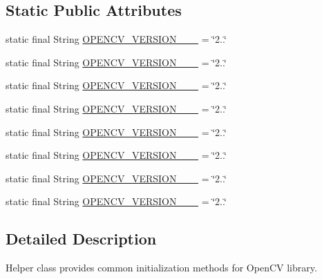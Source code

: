 \subsection*{Static Public Attributes}
\begin{DoxyCompactItemize}
\item 
static final String \mbox{\hyperlink{classorg_1_1opencv_1_1android_1_1_open_c_v_loader_a8318aebf0d76ee4686fc6ce690de74ac}{O\+P\+E\+N\+C\+V\+\_\+\+V\+E\+R\+S\+I\+O\+N\+\_\+\_\+\_}} = \char`\"{}2..\char`\"{}
\item 
static final String \mbox{\hyperlink{classorg_1_1opencv_1_1android_1_1_open_c_v_loader_af78d4d269fd1d6f56f1ba17c6fa5c58e}{O\+P\+E\+N\+C\+V\+\_\+\+V\+E\+R\+S\+I\+O\+N\+\_\+\_\+\_}} = \char`\"{}2..\char`\"{}
\item 
static final String \mbox{\hyperlink{classorg_1_1opencv_1_1android_1_1_open_c_v_loader_a30becc4db82addcca79f8463050ea322}{O\+P\+E\+N\+C\+V\+\_\+\+V\+E\+R\+S\+I\+O\+N\+\_\+\_\+\_}} = \char`\"{}2..\char`\"{}
\item 
static final String \mbox{\hyperlink{classorg_1_1opencv_1_1android_1_1_open_c_v_loader_a92a90cbf1fa3a10dd2e79621b5418647}{O\+P\+E\+N\+C\+V\+\_\+\+V\+E\+R\+S\+I\+O\+N\+\_\+\_\+\_}} = \char`\"{}2..\char`\"{}
\item 
static final String \mbox{\hyperlink{classorg_1_1opencv_1_1android_1_1_open_c_v_loader_a86b49d4cf1560a70894d1b75c08aae99}{O\+P\+E\+N\+C\+V\+\_\+\+V\+E\+R\+S\+I\+O\+N\+\_\+\_\+\_}} = \char`\"{}2..\char`\"{}
\item 
static final String \mbox{\hyperlink{classorg_1_1opencv_1_1android_1_1_open_c_v_loader_a873cb927b0cbeb0613c58cd85777ee67}{O\+P\+E\+N\+C\+V\+\_\+\+V\+E\+R\+S\+I\+O\+N\+\_\+\_\+\_}} = \char`\"{}2..\char`\"{}
\item 
static final String \mbox{\hyperlink{classorg_1_1opencv_1_1android_1_1_open_c_v_loader_a202619614f4bccdf765d3ec01c0ce807}{O\+P\+E\+N\+C\+V\+\_\+\+V\+E\+R\+S\+I\+O\+N\+\_\+\_\+\_}} = \char`\"{}2..\char`\"{}
\item 
static final String \mbox{\hyperlink{classorg_1_1opencv_1_1android_1_1_open_c_v_loader_a08fa35fe0300fc28d2cc4f8cca2f235d}{O\+P\+E\+N\+C\+V\+\_\+\+V\+E\+R\+S\+I\+O\+N\+\_\+\_\+\_}} = \char`\"{}2..\char`\"{}
\end{DoxyCompactItemize}


\subsection{Detailed Description}
Helper class provides common initialization methods for Open\+CV library. 

